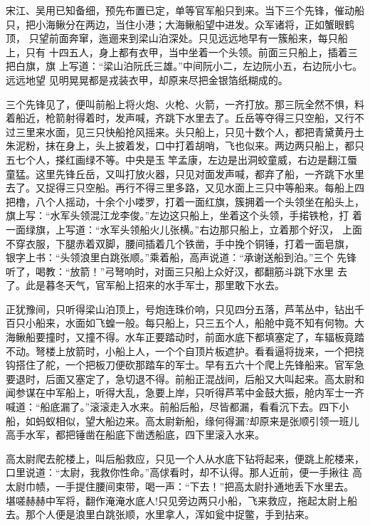 宋江、吴用已知备细，预先布置已定，单等官军船只到来。当下三个先锋，催动船
只，把小海鳅分在两边，当住小港；大海鳅船望中进发。众军诸将，正如蟹眼鹤顶，
只望前面奔窜，迤逦来到梁山泊深处。只见远远地早有一簇船来，每只船上，只有
十四五人，身上都有衣甲，当中坐着一个头领。前面三只船上，插着三把白旗，旗
上写道：“梁山泊阮氏三雄。”中间阮小二，左边阮小五，右边阮小七。远远地望
见明晃晃都是戎装衣甲，却原来尽把金银箔纸糊成的。

三个先锋见了，便叫前船上将火炮、火枪、火箭，一齐打放。那三阮全然不惧，料
着船近，枪箭射得着时，发声喊，齐跳下水里去了。丘岳等夺得三只空船，又行不
过三里来水面，见三只快船抢风摇来。头只船上，只见十数个人，都把青黛黄丹土
朱泥粉，抹在身上，头上披着发，口中打着胡哨，飞也似来。两边两只船上，都只
五七个人，搽红画绿不等。中央是玉竿孟康，左边是出洞蛟童威，右边是翻江蜃
童猛。这里先锋丘岳，又叫打放火器，只见对面发声喊，都弃了船，一齐跳下水里
去了。又捉得三只空船。再行不得三里多路，又见水面上三只中等船来。每船上四
把橹，八个人摇动，十余个小喽罗，打着一面红旗，簇拥着一个头领坐在船头上，
旗上写：“水军头领混江龙李俊。”左边这只船上，坐着这个头领，手掿铁枪，打
着一面绿旗，上写道：“水军头领船火儿张横。”右边那只船上，立着那个好汉，
上面不穿衣服，下腿赤着双脚，腰间插着几个铁凿，手中挽个铜锤，打着一面皂旗，
银字上书：“头领浪里白跳张顺。”乘着船，高声说道：“承谢送船到泊。”三个
先锋听了，喝教：“放箭！”弓弩响时，对面三只船上众好汉，都翻筋斗跳下水里
去了。此是暮冬天气，官军船上招来的水手军士，那里敢下水去。

正犹豫间，只听得梁山泊顶上，号炮连珠价响，只见四分五落，芦苇丛中，钻出千
百只小船来，水面如飞蝗一般。每只船上，只三五个人，船舱中竟不知有何物。大
海鳅船要撞时，又撞不得。水车正要踏动时，前面水底下都填塞定了，车辐板竟踏
不动。弩楼上放箭时，小船上人，一个个自顶片板遮护。看看逼将拢来，一个把挠
钩搭住了舵，一个把板刀便砍那踏车的军士。早有五六十个爬上先锋船来。官军急
要退时，后面又塞定了，急切退不得。前船正混战间，后船又大叫起来。高太尉和
闻参谋在中军船上，听得大乱，急要上岸，只听得芦苇中金鼓大振，舱内军士一齐
喊道：“船底漏了。”滚滚走入水来。前船后船，尽皆都漏，看看沉下去。四下小
船，如蚂蚁相似，望大船边来。高太尉新船，缘何得漏?却原来是张顺引领一班儿
高手水军，都把锤凿在船底下凿透船底，四下里滚入水来。

高太尉爬去舵楼上，叫后船救应，只见一个人从水底下钻将起来，便跳上舵楼来，
口里说道：“太尉，我救你性命。”高俅看时，却不认得。那人近前，便一手揪往
高太尉巾帻，一手提住腰间束带，喝一声：“下去！”把高太尉扑通地丢下水里去。
堪嗟赫赫中军将，翻作淹淹水底人!只见旁边两只小船，飞来救应，拖起太尉上船
去。那个人便是浪里白跳张顺，水里拿人，浑如瓮中捉鳖，手到拈来。

